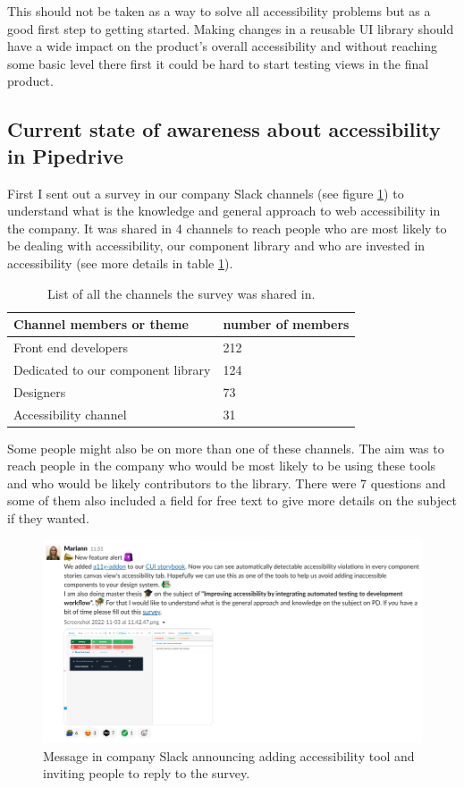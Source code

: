 \documentclass{master_thesis}
\begin{document}
This should not be taken as a way to solve all accessibility problems but as a good first step to getting started. Making changes in a reusable UI library should have a wide impact on the product's overall accessibility and without reaching some basic level there first it could be hard to start testing views in the final product.

\subsection{Current state of awareness about accessibility in Pipedrive}

First I sent out a survey in our company Slack channels (see figure \ref{fig:slack-message}) to understand what is the knowledge and general approach to web accessibility in the company. It was shared in 4 channels to reach people who are most likely to be dealing with accessibility, our component library and who are invested in accessibility (see more details in table \ref{table:survey-shared}).

\begin{table}[H]
	\centering
	\begin{tabular}{|l|l|}
		\hline
		\textbf{Channel members or theme} & \textbf{number of members}  \\
		\hline
		Front end developers  & 212  \\
		\hline
		Dedicated to our component library  & 124  \\
		\hline
		Designers  & 73  \\
		\hline
		Accessibility channel  & 31  \\
		\hline
	\end{tabular}
	\caption{List of all the channels the survey was shared in.}
	\label{table:survey-shared}
\end{table}

Some people might also be on more than one of these channels. The aim was to reach people in the company who would be most likely to be using these tools and who would be likely contributors to the library. There were 7 questions and some of them also included a field for free text to give more details on the subject if they wanted.

\begin{figure}[H]
	\includegraphics[width=\textwidth]{img/survey.png}
	\caption{Message in company Slack announcing adding accessibility tool and inviting people to reply to the survey.}
	\label{fig:slack-message}
\end{figure}
\end{document}
